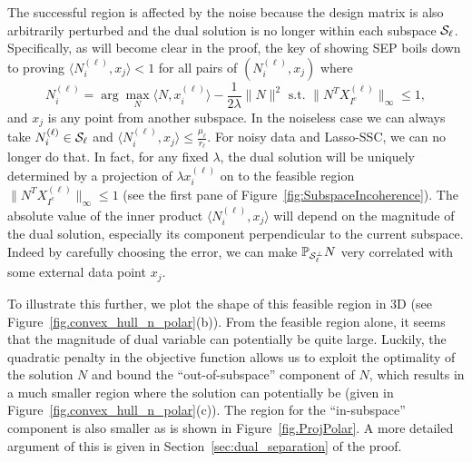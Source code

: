 \documentclass{ctexart}
\begin{document}
The successful region is affected by the noise because the design matrix is also arbitrarily perturbed and the dual solution is no longer within each subspace $\mathcal{S}_\ell$. Specifically, as will become clear in the proof, the key of showing SEP boils down to proving
$
\langle N_i^{(\ell)}, x_j\rangle < 1
$
for all pairs of $(N_i^{(\ell)}, x_j)$ where
$$ N_i^{(\ell)}=\arg\max_{N} \langle N, x_i^{(\ell)}\rangle  -\frac{1}{2\lambda}\|N\|^2 \text{ s.t. }  \|N^TX_{I^c}^{(\ell)} \|_\infty \leq 1,$$
and $x_j$ is any point from another subspace. In the noiseless case we can always take $N_i^{(\ell)}\in\mathcal{S}_\ell$ and $\langle N_i^{(\ell)}, x_j\rangle \leq \frac{\mu_\ell}{r_\ell}$. For noisy data and Lasso-SSC, we can no longer do that. In fact, for any fixed $\lambda$, the dual solution will be uniquely determined by a projection of $\lambda x_i^{(\ell)}$ on to the feasible region $\|N^TX_{I^c}^{(\ell)} \|_\infty \leq 1$ (see the first pane of Figure~\ref{fig:SubspaceIncoherence}). The absolute value of the inner product $\langle N_i^{(\ell)}, x_j\rangle$ will depend on the magnitude of the dual solution, especially its component perpendicular to the current subspace. Indeed by carefully choosing the error, we can make $\mathbb{P}_{\mathcal{S}_\ell^{\perp}}N$ very correlated with some external data point $x_j$.


To illustrate this further, we plot the shape of this feasible region in 3D (see Figure~\ref{fig.convex_hull_n_polar}(b)). From the feasible region alone, it seems that the magnitude of dual variable can potentially be quite large. Luckily, the quadratic penalty in the objective function allows us to exploit the optimality of the solution $N$ and bound the ``out-of-subspace'' component of $N$, which results in a much smaller region where the solution can potentially be (given in Figure~\ref{fig.convex_hull_n_polar}(c)). The region for the ``in-subspace'' component is also smaller as is shown in Figure~\ref{fig.ProjPolar}. A more detailed argument of this is given in Section~\ref{sec:dual_separation} of the proof.
\end{document}

